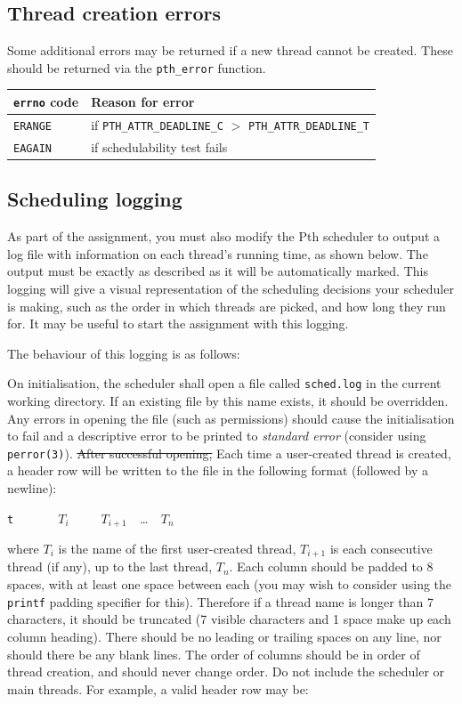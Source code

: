 \documentclass[12pt,a4paper]{article}
\begin{document}
\subsection*{Thread creation errors}

Some additional errors may be returned if a new thread cannot be created. These
should be returned via the \texttt{pth\_error} function.

\begin{longtable}{l l}
    \toprule
    \textbf{\texttt{errno} code} & \textbf{Reason for error} \\
    \midrule
    \texttt{ERANGE} & if \texttt{PTH\_ATTR\_DEADLINE\_C} $>$ \texttt{PTH\_ATTR\_DEADLINE\_T} \\
    \texttt{EAGAIN} & if schedulability test fails \\
    \bottomrule
\end{longtable}

\subsection*{Scheduling logging}

As part of the assignment, you must also modify the Pth scheduler to output a log
file with information on each thread's running time, as shown below. The output
must be exactly as described as it will be automatically marked. This logging
will give a visual representation of the scheduling decisions your scheduler is
making, such as the order in which threads are picked, and how long they run
for. It may be useful to start the assignment with this logging.

The behaviour of this logging is as follows:

On initialisation, the scheduler shall open a file called \texttt{sched.log} in
the current working directory. If an existing file by this name exists, it
should be overridden. Any errors in opening the file (such as permissions)
should cause the initialisation to fail and a descriptive error to be printed
to \textit{standard error} (consider using \texttt{perror(3)}). {\color{red}\sout{After
successful opening,} Each time a user-created thread is created,} a header row will be written to the file in the following
format (followed by a newline):

\verb|t       |$T_i$\verb|     |$T_{i+1}$\verb|  |\dots\verb|  |$T_n$

where $T_i$ is the name of the first {\color{blue}user-created} thread, $T_{i+1}$ is each consecutive
thread (if any), up to the last thread, $T_n$. Each column should be padded to
8 spaces, with at least one space between each (you may wish to consider using
the \texttt{printf} padding specifier for this). Therefore if a thread name is
longer than 7 characters, it should be truncated (7 visible characters and 1
space make up each column heading).  There should be no leading or trailing
spaces on any line, nor should there be any blank lines. The order of columns
should be in order of thread creation, and should never change order. Do not
include the scheduler or main threads. For example, a valid header row may be:
\end{document}
